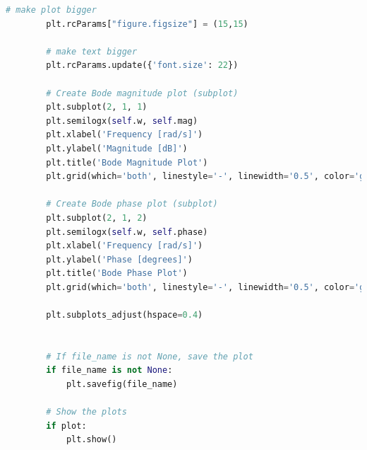 \documentclass{article}
\begin{document}
\begin{lstlisting}[language=Python]
        # make plot bigger
        plt.rcParams["figure.figsize"] = (15,15)

        # make text bigger
        plt.rcParams.update({'font.size': 22})

        # Create Bode magnitude plot (subplot)
        plt.subplot(2, 1, 1)
        plt.semilogx(self.w, self.mag)
        plt.xlabel('Frequency [rad/s]')
        plt.ylabel('Magnitude [dB]')
        plt.title('Bode Magnitude Plot')
        plt.grid(which='both', linestyle='-', linewidth='0.5', color='gray')

        # Create Bode phase plot (subplot)
        plt.subplot(2, 1, 2)
        plt.semilogx(self.w, self.phase)
        plt.xlabel('Frequency [rad/s]')
        plt.ylabel('Phase [degrees]')
        plt.title('Bode Phase Plot')
        plt.grid(which='both', linestyle='-', linewidth='0.5', color='gray')

        plt.subplots_adjust(hspace=0.4)


        # If file_name is not None, save the plot
        if file_name is not None:
            plt.savefig(file_name)

        # Show the plots
        if plot:
            plt.show()
\end{lstlisting}
\end{document}
